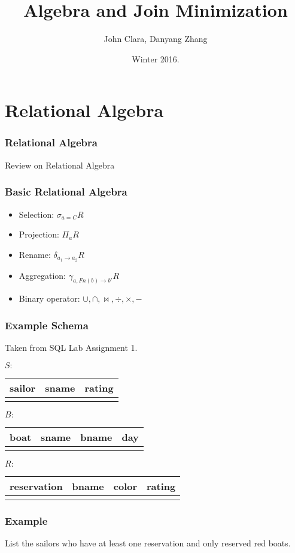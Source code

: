 \documentclass{beamer}
\begin{document}
\title{Algebra and Join Minimization}
\author{John Clara, Danyang Zhang}
\date[WI 2016]{Winter 2016.}

\subject{Algebra and Join Minimization}

\begin{frame}
  \titlepage
\end{frame}
\section{Relational Algebra}

\begin{frame}
  \frametitle{Relational Algebra}
 Review on Relational Algebra
\end{frame}

\begin{frame}
  \frametitle{Basic Relational Algebra}
  \begin{itemize}
  \item Selection: $\sigma_{a=C} R$
  \item Projection: $\Pi_{a}R$
  \item Rename: $\delta_{a_1 \rightarrow a_2}R$
  \item Aggregation: $\gamma_{a, Fn(b)\rightarrow b'}R$
  \item Binary operator: $\cup, \cap, \bowtie, \div, \times, -$
  \end{itemize}
\end{frame}
\begin{frame}
\frametitle{Example Schema}
Taken from SQL Lab Assignment 1.

$S: $
\begin{tabular}{c|cc}
  sailor & sname & rating \\
  \hline
  \\
\end{tabular}

$B: $
\begin{tabular}{c|ccc}
  boat & sname & bname & day\\
  \hline
  \\
\end{tabular}

$R:$
\begin{tabular}{c|ccc}
  reservation & bname  & color & rating \\
  \hline
  \\
\end{tabular}
\end{frame}
\begin{frame}
\frametitle{Example}
List the sailors who have at least one reservation and only reserved red boats.  
\end{frame}
\end{document}
